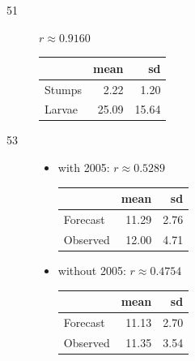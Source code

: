 \documentclass[letterpaper, landscape]{exam}
\begin{document}
\begin{description}
      \item[51] $r \approx 0.9160$

        \begin{tabular}{lrr}
          \toprule
                 & mean  & sd \\
          \midrule
          Stumps & 2.22  & 1.20 \\
          Larvae & 25.09 & 15.64 \\
          \bottomrule
        \end{tabular}


      \item[53]
        \begin{itemize}
          \item with 2005: $r \approx 0.5289$

            \begin{tabular}{lrr}
              \toprule
                       & mean  & sd \\
              \midrule
              Forecast & 11.29 & 2.76 \\
              Observed & 12.00 & 4.71 \\
              \bottomrule
            \end{tabular}

          \item without 2005: $r \approx 0.4754$

          \begin{tabular}{lrr}
            \toprule
                     & mean  & sd \\
            \midrule
            Forecast & 11.13 & 2.70 \\
            Observed & 11.35 & 3.54 \\
            \bottomrule
          \end{tabular}
        \end{itemize}

    \end{description}
  \fi
\end{document}
